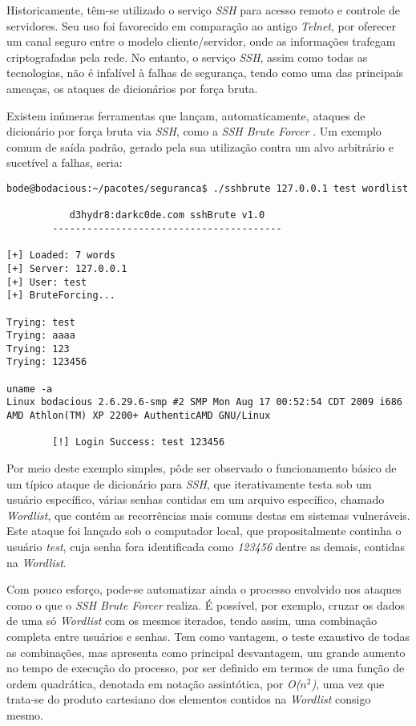 Historicamente, têm-se utilizado o serviço \textit{SSH} para acesso remoto e controle de servidores. Seu uso foi favorecido em comparação ao antigo \textit{Telnet}, por oferecer um canal seguro entre o modelo cliente/servidor, onde as informações trafegam criptografadas pela rede. No entanto, o serviço \textit{SSH}, assim como todas as tecnologias, não é infalível à falhas de segurança, tendo como uma das principais ameaças, os ataques de dicionários por força bruta.

Existem inúmeras ferramentas que lançam, automaticamente, ataques de dicionário por força bruta via \textit{SSH}, como a \textit{SSH Brute Forcer} \cite{SSHBruteForcer}. Um exemplo comum de saída padrão, gerado pela sua utilização contra um alvo arbitrário e sucetível a falhas, seria:

\scriptsize
\begin{verbatim}
bode@bodacious:~/pacotes/seguranca$ ./sshbrute 127.0.0.1 test wordlist

           d3hydr8:darkc0de.com sshBrute v1.0
        ----------------------------------------

[+] Loaded: 7 words
[+] Server: 127.0.0.1
[+] User: test
[+] BruteForcing...

Trying: test
Trying: aaaa
Trying: 123
Trying: 123456

uname -a
Linux bodacious 2.6.29.6-smp #2 SMP Mon Aug 17 00:52:54 CDT 2009 i686
AMD Athlon(TM) XP 2200+ AuthenticAMD GNU/Linux

        [!] Login Success: test 123456
\end{verbatim}
\normalsize

Por meio deste exemplo simples, pôde ser observado o funcionamento básico de um típico ataque de dicionário para \textit{SSH}, que iterativamente testa sob um usuário específico, várias senhas contidas em um arquivo específico, chamado \textit{Wordlist}, que contém as recorrências mais comuns destas em sistemas vulneráveis. Este ataque foi lançado sob o computador local, que propositalmente continha o usuário \textit{test}, cuja senha fora identificada como \textit{123456} dentre as demais, contidas na \textit{Wordlist}.

Com pouco esforço, pode-se automatizar ainda o processo envolvido nos ataques como o que o \textit{SSH Brute Forcer} realiza. É possível, por exemplo, cruzar os dados de uma só \textit{Wordlist} com os mesmos iterados, tendo assim, uma combinação completa entre usuários e senhas. Tem como vantagem, o teste exaustivo de todas as combinações, mas apresenta como principal desvantagem, um grande aumento no tempo de execução do processo, por ser definido em termos de uma função de ordem quadrática, denotada em notação assintótica, por \textit{O(\begin{math}n^2\end{math})}, uma vez que trata-se do produto cartesiano dos elementos contidos na \textit{Wordlist} consigo mesmo.

